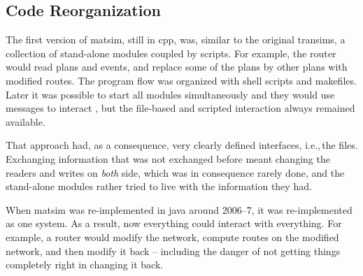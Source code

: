 

%



\subsection{Code Reorganization}
\label{sec:matsim-core-reorg}

The first version of \gls{matsim}, still in \gls{cpp}, was, similar to the original \gls{transims}, a collection of stand-alone modules coupled by scripts.  For example, the router would read plans and events, and replace some of the plans by other plans with modified routes.  The program flow was organized with shell scripts and makefiles.  Later it was possible to start all modules simultaneously and they would use messages to interact \citep[also see][]{GloorNagel2005ped-att04-birkh}, but the file-based and scripted interaction always remained available.

That approach had, as a consequence, very clearly defined interfaces, i.e.,\,the files.  Exchanging information that was not exchanged before meant changing the readers and writes on \emph{both} side, which was in consequence rarely done, and the stand-alone modules rather tried to live with the information they had.

When \acrshort{matsim} was re-implemented in \gls{java} around 2006--7, it was re-implemented as one system.  As a result, now everything could interact with everything.  For example, a router would modify the network, compute routes on the modified network, and then modify it back -- including the danger of not getting things completely right in changing it back.  

